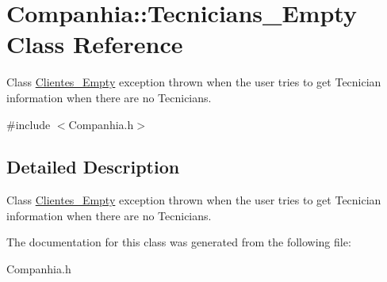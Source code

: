 \hypertarget{class_companhia_1_1_tecnicians___empty}{}\section{Companhia\+:\+:Tecnicians\+\_\+\+Empty Class Reference}
\label{class_companhia_1_1_tecnicians___empty}


Class \hyperlink{class_companhia_1_1_clientes___empty}{Clientes\+\_\+\+Empty} exception thrown when the user tries to get Tecnician information when there are no Tecnicians.  




{\ttfamily \#include $<$Companhia.\+h$>$}



\subsection{Detailed Description}
Class \hyperlink{class_companhia_1_1_clientes___empty}{Clientes\+\_\+\+Empty} exception thrown when the user tries to get Tecnician information when there are no Tecnicians. 

The documentation for this class was generated from the following file\+:\begin{DoxyCompactItemize}
\item 
Companhia.\+h\end{DoxyCompactItemize}
